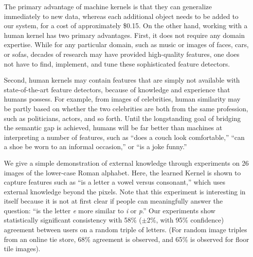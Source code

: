 \documentclass{article}
\begin{document}
The primary advantage of machine kernels is that they can generalize immediately to new data, whereas each additional object needs to be added to our system, for a cost of approximately \$0.15.  On the other hand, working with a human kernel has two primary advantages.  First, it does not require any domain expertise.  While for any particular domain, such as music or images of faces, cars, or sofas, decades of research may have provided high-quality features, one does not have to find, implement, and tune these sophisticated feature detectors.  

Second, human kernels may contain features that are simply not available with state-of-the-art feature detectors, because of knowledge and experience that humans possess.  For example, from images of celebrities, human similarity may be partly based on whether the two celebrities are both from the same profession, such as politicians, actors, and so forth.  Until the longstanding goal of bridging the semantic gap is achieved, humans will be far better than machines at interpreting a number of features, such as ``does a couch look comfortable,'' ``can a shoe be worn to an informal occasion,'' or ``is a joke funny.''

We give a simple demonstration of external knowledge through
experiments on 26 images of the lower-case Roman alphabet.  Here, the
learned Kernel is shown to capture features such as ``is a letter
a vowel versus consonant,'' which uses
external knowledge beyond the pixels.  Note that this experiment is
interesting in itself because it is not at first clear if people can
meaningfully answer the question: ``is the letter {\em e} more similar
to {\em i} or {\em p}.'' Our experiments show statistically significant consistency with 58\%
($\pm$2\%, with 95\% confidence) agreement between users on a random
triple of letters.  (For random image triples from an online tie
store, 68\% agreement is observed, and 65\% is observed for floor tile images).
\end{document}
